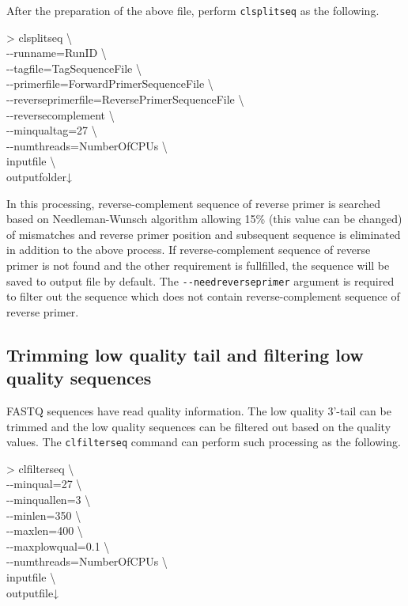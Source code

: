 \documentclass[titlepage,10pt,a4paper,english]{jsbook}
\newenvironment{cmd}{\begin{oframed}\raggedright\ttfamily\footnotesize\setlength{\baselineskip}{1.4em}}{\end{oframed}\vspace{-1em}}
\begin{document}
After the preparation of the above file, perform \texttt{clsplitseq} as the following.

\begin{cmd}
{\textgreater} clsplitseq {\textbackslash}\\
{-}{-}runname=RunID {\textbackslash}\\
{-}{-}tagfile=TagSequenceFile {\textbackslash}\\
{-}{-}primerfile=ForwardPrimerSequenceFile {\textbackslash}\\
{-}{-}reverseprimerfile=ReversePrimerSequenceFile {\textbackslash}\\
{-}{-}reversecomplement {\textbackslash}\\
{-}{-}minqualtag=27 {\textbackslash}\\
{-}{-}numthreads=NumberOfCPUs {\textbackslash}\\
inputfile {\textbackslash}\\
outputfolder↓
\end{cmd}

In this processing, reverse-complement sequence of reverse primer is searched based on Needleman-Wunsch algorithm allowing 15\% (this value can be changed) of mismatches and reverse primer position and subsequent sequence is eliminated in addition to the above process.
If reverse-complement sequence of reverse primer is not found and the other requirement is fullfilled, the sequence will be saved to output file by default.
The \texttt{{-}{-}needreverseprimer} argument is required to filter out the sequence which does not contain reverse-complement sequence of reverse primer.

\subsection{Trimming low quality tail and filtering low quality sequences}\label{subsection:qualityfilteringfor454}

FASTQ sequences have read quality information.
The low quality 3'-tail can be trimmed and the low quality sequences can be filtered out based on the quality values.
The \texttt{clfilterseq} command can perform such processing as the following.

\begin{cmd}
{\textgreater} clfilterseq {\textbackslash}\\
{-}{-}minqual=27 {\textbackslash}\\
{-}{-}minquallen=3 {\textbackslash}\\
{-}{-}minlen=350 {\textbackslash}\\
{-}{-}maxlen=400 {\textbackslash}\\
{-}{-}maxplowqual=0.1 {\textbackslash}\\
{-}{-}numthreads=NumberOfCPUs {\textbackslash}\\
inputfile {\textbackslash}\\
outputfile↓
\end{cmd}
\end{document}
